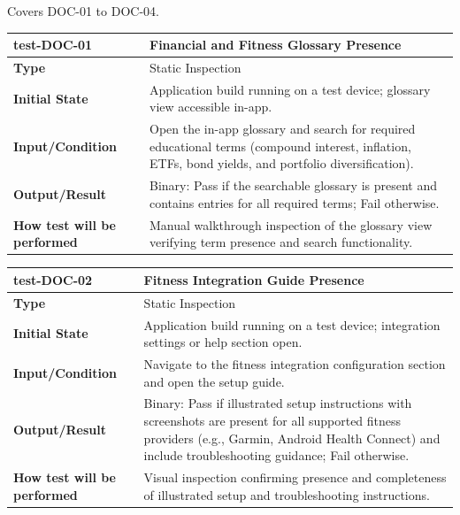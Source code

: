 \documentclass[12pt, titlepage]{article}
\begin{document}
Covers DOC-01 to DOC-04.

\noindent\begin{tabularx}{\textwidth}{>{\raggedright\arraybackslash}p{3.5cm}X}
  \toprule
  \textbf{test-DOC-01} & \textbf{Financial and Fitness Glossary Presence}\\
  \midrule
  \textbf{Type} & Static Inspection\\
  \textbf{Initial State} & Application build running on a test device; glossary view accessible in-app.\\
  \textbf{Input/Condition} & Open the in-app glossary and search for required educational terms (compound interest, inflation, ETFs, bond yields, and portfolio diversification).\\
  \textbf{Output/Result} & Binary: Pass if the searchable glossary is present and contains entries for all required terms; Fail otherwise.\\
  \textbf{How test will be performed} & Manual walkthrough inspection of the glossary view verifying term presence and search functionality.\\
  \bottomrule
\end{tabularx}

\vspace{1em}

\noindent\begin{tabularx}{\textwidth}{>{\raggedright\arraybackslash}p{3.5cm}X}
  \toprule
  \textbf{test-DOC-02} & \textbf{Fitness Integration Guide Presence}\\
  \midrule
  \textbf{Type} & Static Inspection\\
  \textbf{Initial State} & Application build running on a test device; integration settings or help section open.\\
  \textbf{Input/Condition} & Navigate to the fitness integration configuration section and open the setup guide.\\
  \textbf{Output/Result} & Binary: Pass if illustrated setup instructions with screenshots are present for all supported fitness providers (e.g., Garmin, Android Health Connect) and include troubleshooting guidance; Fail otherwise.\\
  \textbf{How test will be performed} & Visual inspection confirming presence and completeness of illustrated setup and troubleshooting instructions.\\
  \bottomrule
\end{tabularx}

\vspace{1em}
\end{document}
